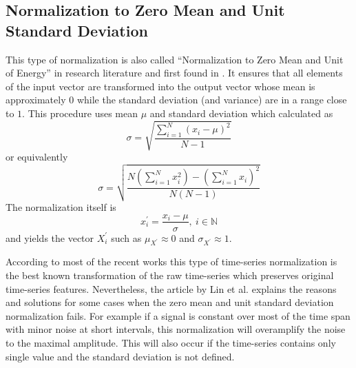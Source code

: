 \subsection{Normalization to Zero Mean and Unit Standard Deviation} \label{sect:normalization}
This type of normalization is also called ``Normalization to Zero Mean and Unit of Energy'' in research literature and first found in \cite{citeulike:3815880}. It ensures that all elements of the input vector are transformed into the output vector whose mean is approximately $0$ while the standard deviation (and variance) are in a range close to $1$.
This procedure uses mean $\mu$ and standard deviation which calculated as 
\begin{equation}
\sigma = \sqrt{ \frac{ \sum_{i=1}^{N} (x_{i} - \mu)^{2} }{ N - 1 } }
\end{equation}
or equivalently
\begin{equation}
\sigma = \sqrt{ \frac{
                  N \left( \sum_{i=1}^{N} x_{i}^{2}  \right) - 
                  \left( \sum_{i=1}^{N} x_{i} \right) ^{2}
                }{
                  N(N-1)
                }  
          }
\end{equation}
The normalization itself is 
\begin{equation}
x_{i}^{'} = \frac{x_{i} - \mu}{\sigma}, \: i \in \mathbb{N}
\end{equation}
and yields the vector $X_{i}^{'}$ such as $\mu_{X^{'}} \approx 0$ and $\sigma_{X^{'}} \approx 1$.

According to most of the recent works \cite{citeulike:3815880} \cite{citeulike:2821475} \cite{citeulike:3978002} this type of time-series normalization is the best known transformation of the raw time-series which preserves original time-series features. Nevertheless, the article by Lin et al. \cite{citeulike:2821475} explains the reasons and solutions for some cases when the zero mean and unit standard deviation normalization fails. For example if a signal is constant over most of the time span with minor noise at short intervals, this normalization will overamplify the noise to the maximal amplitude. This will also occur if the time-series contains only single value and the standard deviation is not defined.